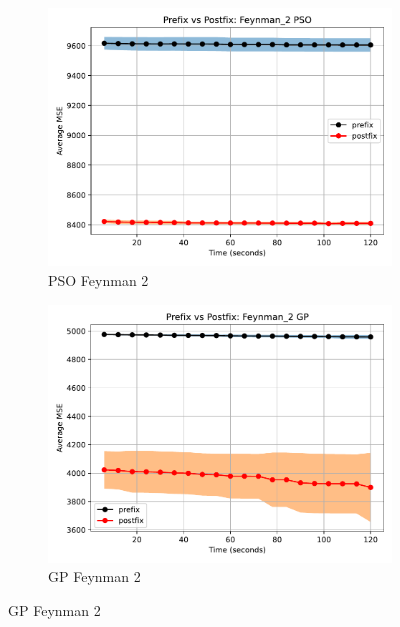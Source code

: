 \documentclass[12pt]{iopart}
\begin{document}
\begin{figure}
    \vspace{0.5cm}
    
    \begin{subfigure}[b]{0.4\textwidth}
        \includegraphics[width=\linewidth, keepaspectratio]{AIFeynman_Benchmarks/PrePostFeynman_2PSO.pdf}
        \caption{PSO Feynman 2}
        \label{subfig:feynman_2_PSO}
    \end{subfigure}
    \begin{subfigure}[b]{0.4\textwidth}
        \includegraphics[width=\linewidth, keepaspectratio]{AIFeynman_Benchmarks/PrePostFeynman_2GP.pdf}
        \caption{GP Feynman 2}
        \label{subfig:feynman_2_GP}
    \end{subfigure}
    

\end{figure}
\end{document}

